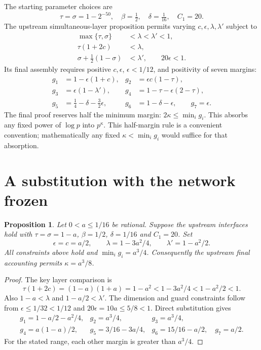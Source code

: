 \documentclass[11pt]{article}
\newtheorem{proposition}{Proposition}
\begin{document}
The starting parameter choices are
\[
 \tau=\sigma=1-2^{-50},\quad \beta=\tfrac12,\quad
 \delta=\tfrac1{16},\quad C_1=20.
\]
The upstream simultaneous-layer proposition permits varying
$c,\epsilon,\lambda,\lambda'$ subject to
\begin{align}
 \max\{\tau,\sigma\}&<\lambda<\lambda'<1,\label{eq:layer1}\\
 \tau(1+2c)&<\lambda,\label{eq:layer2}\\
 \sigma+\tfrac12(1-\sigma)&<\lambda',\qquad 20\epsilon<1.
 \label{eq:layer3}
\end{align}
Its final assembly requires positive $c,\epsilon$, $\epsilon<1/12$,
and positivity of seven margins:
\begin{align*}
 g_1&=1-\epsilon(1+c),&g_2&=\epsilon c(1-\tau),\\
 g_3&=\epsilon(1-\lambda'),&g_4&=1-\tau-\epsilon(2-\tau),\\
 g_5&=\tfrac14-\delta-\tfrac32\epsilon,
 &g_6&=1-\delta-\epsilon,\qquad g_7=\epsilon.
\end{align*}
The final proof reserves half the minimum margin:
$2\kappa\le\min_i g_i$. This absorbs any fixed power of $\log p$ into
$p^\kappa$. This half-margin rule is a convenient convention; mathematically
any fixed $\kappa<\min_i g_i$ would suffice for that absorption.

\section{A substitution with the network frozen}
\begin{proposition}\label{prop:balanced}
Let $0<a\le1/16$ be rational. Suppose the upstream interfaces hold with
$\tau=\sigma=1-a$, $\beta=1/2$, $\delta=1/16$ and $C_1=20$.
Set
\[
 \epsilon=c=a/2,\qquad
 \lambda=1-3a^2/4,\qquad \lambda'=1-a^2/2.
\]
All constraints above hold and $\min_i g_i=a^3/4$. Consequently the
upstream final accounting permits $\kappa=a^3/8$.
\end{proposition}
\begin{proof}
The key layer comparison is
\[
 \tau(1+2c)=(1-a)(1+a)=1-a^2
 <1-3a^2/4<1-a^2/2<1.
\]
Also $1-a<\lambda$ and $1-a/2<\lambda'$.
The dimension and guard constraints follow from
$\epsilon\le1/32<1/12$ and $20\epsilon=10a\le5/8<1$.
Direct substitution gives
\[
\begin{array}{lll}
g_1=1-a/2-a^2/4,&g_2=a^3/4,&g_3=a^3/4,\\[2pt]
g_4=a(1-a)/2,&g_5=3/16-3a/4,&g_6=15/16-a/2,\quad g_7=a/2.
\end{array}
\]
For the stated range, each other margin is greater than $a^3/4$.
\end{proof}
\end{document}
